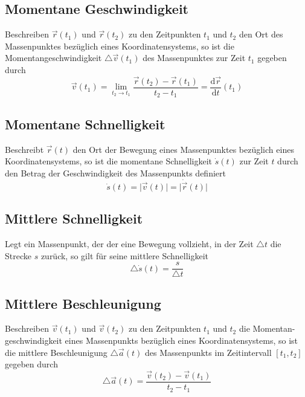 \subsection{Momentane Geschwindigkeit}
Beschreiben $\overrightarrow{r}\left(t_1\right)$ und $\overrightarrow{r}\left(t_2\right)$ zu den Zeitpunkten $t_1$ und $t_2$ den Ort des Massenpunktes bezüglich eines Koordinatensystems, so ist die Momentangeschwindigkeit $\triangle \overrightarrow{v}\left(t_1\right)$ des Massenpunktes zur Zeit $t_1$ gegeben durch
\begin{equation} 
\boxed{\overrightarrow{v}\left(t_1\right)=\displaystyle \lim_{t_2\rightarrow t_1}\dfrac{\overrightarrow{r}\left(t_2\right)-\overrightarrow{r}\left(t_1\right)}{t_2-t_1}=\dfrac{\text{d} \overrightarrow{r}}{\text{d}t}\left(t_1\right)}
\end{equation} 
\subsection{Momentane Schnelligkeit}
Beschreibt $\overrightarrow{r}\left(t\right)$ den Ort der Bewegung eines Massenpunktes bezüglich eines Koordinatensystems, so ist die momentane Schnelligkeit $\dot{s}\left(t\right)$ zur Zeit $t$ durch den Betrag der Geschwindigkeit des Massenpunkts definiert
\begin{equation}
\boxed{\dot{s}\left(t\right)=\Big\vert\overrightarrow{v}\left(t\right) \Big\vert=\Big\vert\dot{\overrightarrow{r}}\left(t\right) \Big\vert}
\end{equation}
\subsection{Mittlere Schnelligkeit}
Legt ein Massenpunkt, der der eine Bewegung vollzieht, in der Zeit $\triangle t$ die Strecke $s$ zurück, so gilt für seine mittlere Schnelligkeit
\begin{equation}
\boxed{\triangle \dot{s}\left(t\right)=\dfrac{s}{\triangle t}}
\end{equation}

\subsection{Mittlere Beschleunigung}
Beschreiben $\overrightarrow{v}\left(t_1\right)$ und $\overrightarrow{v}\left(t_2\right)$ zu den Zeitpunkten $t_1$ und $t_2$ die Momentan-geschwindigkeit eines Massenpunkts bezüglich eines Koordinatensystems, so ist die mittlere Beschleunigung $\triangle \overrightarrow{a}\left(t\right)$ des Massenpunkts im Zeitintervall $[t_1, t_2]$ gegeben durch
\begin{equation}
\boxed{\triangle \overrightarrow{a}\left(t\right)=\dfrac{\overrightarrow{v}\left(t_2\right)-\overrightarrow{v}\left(t_1\right)}{t_2-t_1}}
\end{equation}
